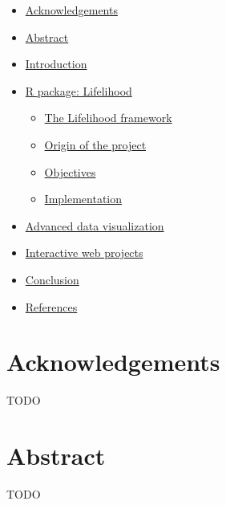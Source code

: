 \documentclass[
]{article}
\providecommand{\tightlist}{%
  \setlength{\itemsep}{0pt}\setlength{\parskip}{0pt}}
\begin{document}
\begin{itemize}
\tightlist
\item
  \protect\hyperlink{acknowledgements}{Acknowledgements}\\
\item
  \protect\hyperlink{abstract}{Abstract}\\
\item
  \protect\hyperlink{introduction}{Introduction}\\
\item
  \protect\hyperlink{r-package-lifelihood}{R package: Lifelihood}

  \begin{itemize}
  \tightlist
  \item
    \protect\hyperlink{the-lifelihood-framework}{The Lifelihood
    framework}
  \item
    \protect\hyperlink{origin-of-the-project}{Origin of the project}
  \item
    \protect\hyperlink{objectives}{Objectives}
  \item
    \protect\hyperlink{implementation}{Implementation}\\
  \end{itemize}
\item
  \protect\hyperlink{advanced-data-visualization}{Advanced data
  visualization}\\
\item
  \protect\hyperlink{interactive-web-projects}{Interactive web
  projects}\\
\item
  \protect\hyperlink{conclusion}{Conclusion}\\
\item
  \protect\hyperlink{references}{References}
\end{itemize}

\newpage

\hypertarget{acknowledgements}{%
\section{Acknowledgements}\label{acknowledgements}}

TODO

\newpage

\hypertarget{abstract}{%
\section{Abstract}\label{abstract}}

TODO
\end{document}
